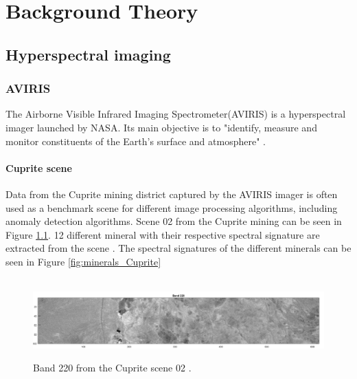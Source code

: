 \newpage
\chapter{Background Theory}
\label{sec:theory}

\section{Hyperspectral imaging}
\subsection{AVIRIS}
The Airborne Visible Infrared Imaging Spectrometer(AVIRIS) is a hyperspectral imager launched by NASA. Its main objective is to "identify, measure and monitor constituents of the Earth's surface and atmosphere" \cite{aviris}. 
\subsubsection{Cuprite scene}
Data from the Cuprite mining district \cite{Cuprite_data} captured by the AVIRIS imager is often used as a benchmark scene for different image processing algorithms, including anomaly detection algorithms. Scene 02 from the Cuprite mining can be seen in Figure \ref{fig:cuprite_mining_scene}. 12 different mineral with their respective spectral signature are extracted from the scene \cite{aviris_minerals}. The spectral signatures of the different minerals can be seen in Figure \ref{fig:minerals_Cuprite} 

\begin{figure}[H]
\hbox{\hspace*{-1cm}                                              
   \includegraphics[scale=0.55]{images/AD_testing/original_band_220_22_1.png}}
  \caption{ Band 220 from the Cuprite scene 02 \cite{Cuprite_data}. } 
  \label{fig:cuprite_mining_scene}
\end{figure}

